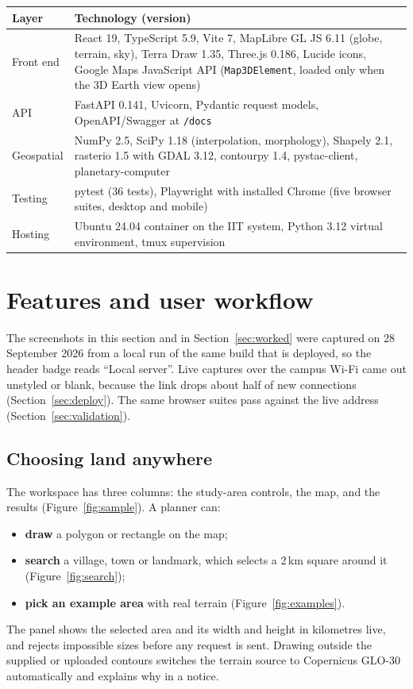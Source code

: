 \documentclass[11pt,a4paper]{article}
\newcommand{\code}[1]{\texttt{#1}}
\begin{document}
\begin{tabularx}{\linewidth}{@{}L{30mm}Y@{}}
\toprule
\textbf{Layer} & \textbf{Technology (version)}\\
\midrule
Front end & React 19, TypeScript 5.9, Vite 7, MapLibre GL JS 6.11 (globe, terrain, sky), Terra Draw 1.35, Three.js 0.186, Lucide icons, Google Maps JavaScript API (\code{Map3DElement}, loaded only when the 3D Earth view opens)\\
API & FastAPI 0.141, Uvicorn, Pydantic request models, OpenAPI/Swagger at \code{/docs}\\
Geospatial & NumPy 2.5, SciPy 1.18 (interpolation, morphology), Shapely 2.1, rasterio 1.5 with GDAL 3.12, contourpy 1.4, pystac-client, planetary-computer\\
Testing & pytest (36 tests), Playwright with installed Chrome (five browser suites, desktop and mobile)\\
Hosting & Ubuntu 24.04 container on the IIT system, Python 3.12 virtual environment, tmux supervision\\
\bottomrule
\end{tabularx}

\clearpage
\section{Features and user workflow}
\label{sec:features}
The screenshots in this section and in Section~\ref{sec:worked} were captured on 28 September 2026 from a local run of the same build that is deployed, so the header badge reads ``Local server''. Live captures over the campus Wi-Fi came out unstyled or blank, because the link drops about half of new connections (Section~\ref{sec:deploy}). The same browser suites pass against the live address (Section~\ref{sec:validation}).

\subsection{Choosing land anywhere}
The workspace has three columns: the study-area controls, the map, and the results (Figure~\ref{fig:sample}). A planner can:
\begin{itemize}
\item \textbf{draw} a polygon or rectangle on the map;
\item \textbf{search} a village, town or landmark, which selects a 2\,km square around it (Figure~\ref{fig:search});
\item \textbf{pick an example area} with real terrain (Figure~\ref{fig:examples}).
\end{itemize}
The panel shows the selected area and its width and height in kilometres live, and rejects impossible sizes before any request is sent. Drawing outside the supplied or uploaded contours switches the terrain source to Copernicus GLO-30 automatically and explains why in a notice.
\end{document}
